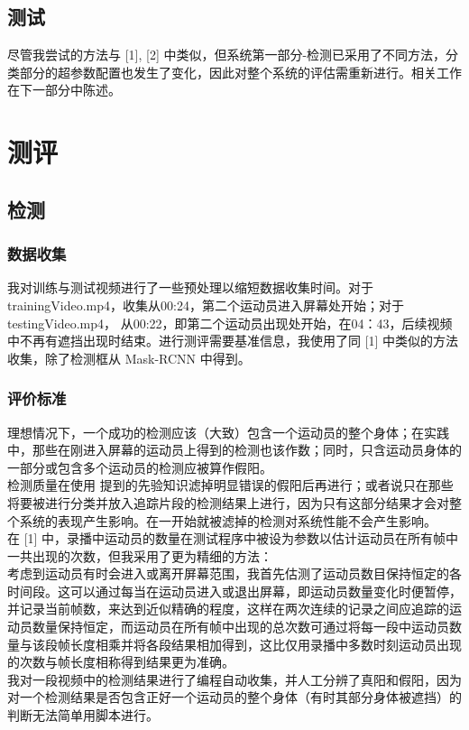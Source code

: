 \documentclass{article}
\begin{document}
\subsection{测试}
尽管我尝试的方法与 [1], [2] 中类似，但系统第一部分-检测已采用了不同方法，分类部分的超参数配置也发生了变化，因此对整个系统的评估需重新进行。相关工作在下一部分中陈述。
\newpage

\section{测评}
\subsection{检测}
\subsubsection{数据收集}
我对训练与测试视频进行了一些预处理以缩短数据收集时间。对于trainingVideo.mp4，收集从00:24，第二个运动员进入屏幕处开始；对于testingVideo.mp4， 从00:22，即第二个运动员出现处开始，在04：43，后续视频中不再有遮挡出现时结束。进行测评需要基准信息，我使用了同 [1] 中类似的方法收集，除了检测框从 Mask-RCNN 中得到。
\subsubsection{评价标准}
理想情况下，一个成功的检测应该（大致）包含一个运动员的整个身体；在实践中，那些在刚进入屏幕的运动员上得到的检测也该作数；同时，只含运动员身体的一部分或包含多个运动员的检测应被算作假阳。\\
检测质量在使用  提到的先验知识滤掉明显错误的假阳后再进行；或者说只在那些将要被进行分类并放入追踪片段的检测结果上进行，因为只有这部分结果才会对整个系统的表现产生影响。在一开始就被滤掉的检测对系统性能不会产生影响。\\
在 [1] 中，录播中运动员的数量在测试程序中被设为参数以估计运动员在所有帧中一共出现的次数，但我采用了更为精细的方法：\\
考虑到运动员有时会进入或离开屏幕范围，我首先估测了运动员数目保持恒定的各时间段。这可以通过每当在运动员进入或退出屏幕，即运动员数量变化时便暂停，并记录当前帧数，来达到近似精确的程度，这样在两次连续的记录之间应追踪的运动员数量保持恒定，而运动员在所有帧中出现的总次数可通过将每一段中运动员数量与该段帧长度相乘并将各段结果相加得到，这比仅用录播中多数时刻运动员出现的次数与帧长度相称得到结果更为准确。\\
我对一段视频中的检测结果进行了编程自动收集，并人工分辨了真阳和假阳，因为对一个检测结果是否包含正好一个运动员的整个身体（有时其部分身体被遮挡）的判断无法简单用脚本进行。\\
\end{document}

